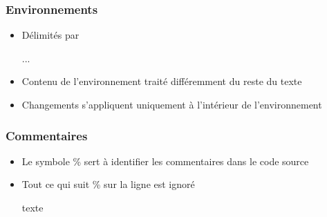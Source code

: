 \begin{frame}[fragile]

	\frametitle{Environnements}
	
	\begin{itemize}
		\item Délimités par
		
	\begin{codesource}
	\begin{environnement}
		...
	\end{environnement}
	\end{codesource}
	
		\item Contenu de l’environnement traité différemment du reste du texte
		\item Changements s’appliquent uniquement à l’intérieur de l’environnement
	\end{itemize}

\end{frame}


\begin{frame}[fragile]
	
	\frametitle{Commentaires}
	
	\begin{itemize}
		\item Le symbole \% sert à identifier les commentaires dans le code	source
		\item Tout ce qui suit \% sur la ligne est ignoré
		
		\begin{codesource}
	texte %
		\end{codesource}
	\end{itemize}
\end{frame}


